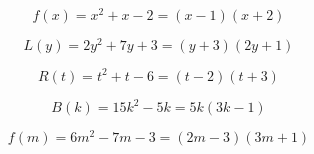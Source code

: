 \documentclass{ximera}
\author{Lee Wayand}
\begin{document}
\begin{exercise}








\begin{question}


\[
f(x) = x^2 + x - 2 = (x-1) \left( x+2 \right)
\]

\end{question}





\begin{question}


\[
L(y) = 2y^2 + 7y + 3 = (y+3) \left( 2y+1 \right)
\]

\end{question}





\begin{question}


\[
R(t) = t^2 + t - 6 = (t-2) \left( t+3 \right)
\]

\end{question}





\begin{question}


\[
B(k) = 15k^2 - 5k = 5k \left( 3k - 1 \right)
\]

\end{question}








\begin{question}


\[
f(m) = 6m^2 -7m - 3 = (2m - 3) \left( 3m + 1 \right)
\]

\end{question}












\end{exercise}
\end{document}
